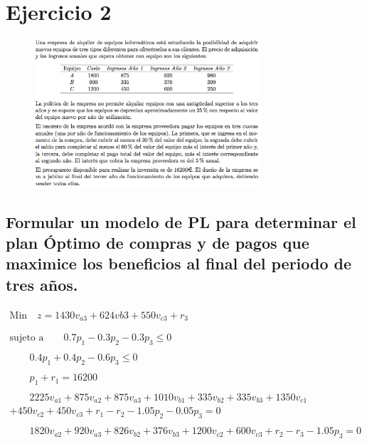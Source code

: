\documentclass[10pt, a4paper]{article}
\begin{document}
    \section{Ejercicio 2}

        \begin{figure}[H]
        \centering
            \includegraphics[width=0.75\textwidth]{res/Exercise_2.png}
        \end{figure}

		\subsection{Formular un modelo de PL para determinar el plan Óptimo de compras y de pagos que maximice los beneficios al final del periodo de tres años.}

			\paragraph{}

			\[
\begin{split}
				\text{Min} \quad z =1430v_{a3} + 624v{b3} + 550v_{c3} + r_{3}  \\
									\\ \\
				\text{sujeto a}
				\qquad 	0.7p_{1} - 0.3p_{2} - 0.3p_{3} \leq 0  \\ \\
				\qquad 	0.4p_{1} + 0.4p_{2} - 0.6p_{3} \leq 0  \\ \\
				\qquad 	p_{1} + r_{1} = 16200  \\ \\
				\qquad 	2225v_{a1} + 875v_{a2} + 875v_{a3} + 1010v_{b1} + 335v_{b2} + 335v_{b3} + 1350v_{c1} \\
				+ 450v_{c2} + 450v_{c3} + r_{1} - r_{2} - 1.05p_{2} - 0.05p_{3}  = 0  \\ \\
				\qquad 	1820v_{a2} + 920v_{a3} + 826v_{b2} + 376v_{b3} + 1200v_{c2} + 600v_{c3} + r_{2} - r_{3} - 1.05p_{3} = 0   \\
\end{split}
\]
\end{document}
